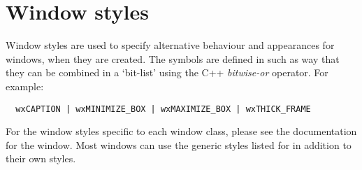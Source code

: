 \section{Window styles}\label{windowstyles}

Window styles are used to specify alternative behaviour and appearances for windows, when they are
created. The symbols are defined in such as way that they can be combined in a `bit-list' using the
C++ {\it bitwise-or} operator. For example:

\begin{verbatim}
  wxCAPTION | wxMINIMIZE_BOX | wxMAXIMIZE_BOX | wxTHICK_FRAME
\end{verbatim}

For the window styles specific to each window class, please see the documentation
for the window. Most windows can use the generic styles listed for  in
addition to their own styles.

